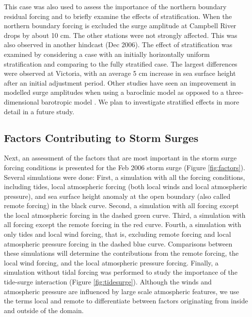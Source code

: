 \documentclass[letterpaper]{tATO2e}
\begin{document}
{\color{red} This case was also used to assess the importance of the northern boundary residual forcing and to briefly examine the effects of stratification. When the northern boundary forcing is excluded the surge amplitude at Campbell River drops by about 10 cm. The other stations were not strongly affected. This was also observed in another hindcast (Dec 2006). The effect of stratification was examined by considering a case with an initially horizontally uniform stratification and comparing to the fully stratified case. The largest differences were observed at Victoria, with an average 5 cm increase in sea surface height after an initial adjustment period. Other studies have seen an improvement in modelled surge amplitudes when using a baroclinic model as opposed to a three-dimensional barotropic model \citep{ma2015oceanic}. We plan to investigate stratified effects in more detail in a future study.} 

\subsection{Factors Contributing to Storm Surges}\label{sec:factors}

Next, an assessment of the factors that are most important in the storm surge forcing conditions is presented for the Feb 2006 storm surge (Figure \ref{fig:factors}). Several simulations were done: First, a simulation with all the forcing conditions, including tides, local atmospheric forcing (both local winds and local atmospheric pressure), and sea surface height anomaly at the open boundary (also called remote forcing) in the black curve. Second, a simulation with all forcing except the local atmospheric forcing in the dashed green curve. Third, a simulation with all forcing except the remote forcing in the red curve. Fourth, a simulation with only tides and local wind forcing, that is, excluding remote forcing and local atmospheric pressure forcing in the dashed blue curve. {\color{red} Comparisons between these simulations will determine the contributions from the remote forcing, the local wind forcing, and the local atmospheric pressure forcing.} Finally, a simulation without tidal forcing was performed to study the importance of the tide-surge interaction (Figure \ref{fig:tidesurge}).  {\color{red} Although the winds and atmospheric pressure are influenced by large scale atmospheric features, we use the terms local and remote to differentiate between factors originating from inside and outside of the domain.} 
\end{document}
